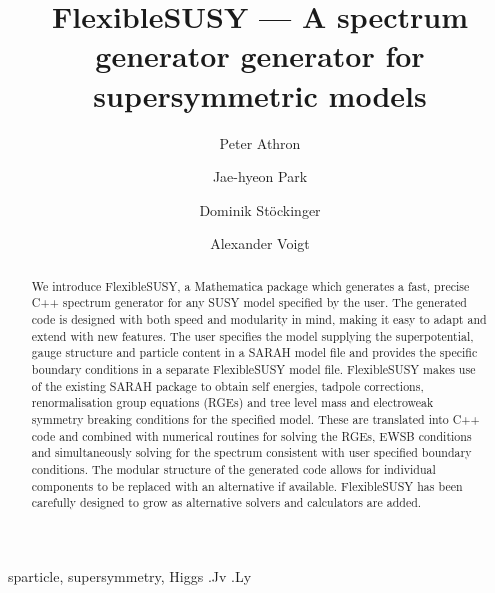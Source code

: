 \documentclass[final,3p,11pt,pdflatex]{elsarticle}
\makeatletter
\newcommand{\sarah}{SARAH\@\xspace}
\newcommand{\fs}{FlexibleSUSY\@\xspace}
\newcommand{\mathematica}{Mathematica\xspace}
\makeatother
\begin{document}
\begin{frontmatter}

 \title{\Large\bf FlexibleSUSY --- A spectrum generator generator for supersymmetric models}

\author[adelaide]{Peter Athron}
\author[valencia]{Jae-hyeon Park}
\author[dresden]{Dominik St\"ockinger}
\author[dresden]{Alexander Voigt}
\address[adelaide]{ARC Centre of Excellence for Particle Physics at 
the Tera-scale, School of Chemistry and Physics, University of Adelaide, 
Adelaide SA 5005 Australia}
\address[valencia]{Departament de F\'{i}sica Te\`{o}rica and IFIC,
Universitat de Val\`{e}ncia-CSIC,
46100, Burjassot, Spain}
\address[dresden]{Institut f\"ur Kern- und Teilchenphysik,
TU Dresden, Zellescher Weg 19, 01069 Dresden, Germany}
   
  \begin{abstract}
   We introduce \fs, a \mathematica package which generates a fast,
   precise C++ spectrum generator for any SUSY model specified by the
   user.  The generated code is designed with both speed and
   modularity in mind, making it easy to adapt and extend with new
   features. The user specifies the model supplying the
   superpotential, gauge structure and particle content in a \sarah
   model file and provides the specific boundary conditions in a
   separate \fs model file. \fs makes use of the existing \sarah
   package to obtain self energies, tadpole corrections,
   renormalisation group equations (RGEs) and tree level mass and
   electroweak symmetry breaking conditions for the specified model. These are
   translated into C++ code and combined  with numerical
   routines for solving the RGEs, EWSB conditions and simultaneously
   solving for the spectrum consistent with user specified boundary
   conditions.  The modular structure of the generated code allows for
   individual components to be replaced with an alternative if
   available. \fs has been carefully designed to grow as
   alternative solvers and calculators are added.
  \end{abstract}

\begin{keyword}
sparticle, 
supersymmetry, 
Higgs
.Jv
.Ly
\end{keyword}
\end{frontmatter}
\end{document}
